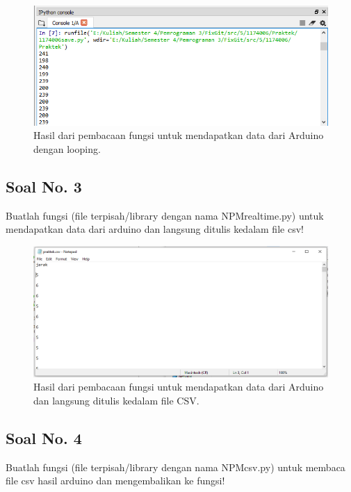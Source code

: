\begin{figure}[H]
	\includegraphics[width=12cm]{figures/5/1174089/Praktek/2.png}
	\centering
	\caption{Hasil dari pembacaan fungsi untuk mendapatkan data dari Arduino dengan looping.}
\end{figure}

\subsection{Soal No. 3}
Buatlah  fungsi  (file  terpisah/library  dengan  nama  NPMrealtime.py) untuk mendapatkan data dari arduino dan langsung ditulis kedalam file csv!


\begin{figure}[H]
	\includegraphics[width=12cm]{figures/5/1174089/Praktek/3.png}
	\centering
	\caption{Hasil dari pembacaan fungsi untuk mendapatkan data dari Arduino dan langsung ditulis kedalam file CSV.}
\end{figure}

\subsection{Soal No. 4}
Buatlah fungsi (file terpisah/library dengan nama NPMcsv.py) untuk membaca file csv hasil arduino dan mengembalikan ke fungsi!


